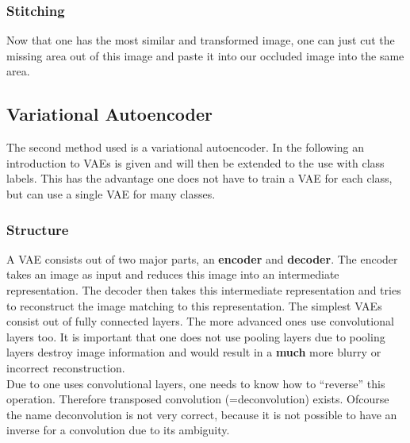 \documentclass[
     11pt,         %
     a4paper,      %
     oneside,
     ]{article}
\begin{document}
\subsubsection{Stitching}
Now that one has the most similar and transformed image, one can just cut the missing area out of this image and paste it into our occluded image into the same area.

\subsection{Variational Autoencoder}
The second method used is a variational autoencoder. In the following an introduction to VAEs is given and will then be extended to the use with class labels. This has the advantage one does not have to train a VAE for each class, but can use a single VAE for many classes.
\subsubsection{Structure}
A VAE consists out of two major parts, an \textbf{encoder} and \textbf{decoder}. The encoder takes an image as input and reduces this image into an intermediate representation. The decoder then takes this intermediate representation and tries to reconstruct the image matching to this representation. The simplest VAEs consist out of fully connected layers. The more advanced ones use convolutional layers too. It is important that one does not use pooling layers due to pooling layers destroy image information and would result in a \textbf{much} more blurry or incorrect reconstruction. \\
Due to one uses convolutional layers, one needs to know how to \enquote{reverse} this operation. Therefore transposed convolution (=deconvolution) exists. Ofcourse the name deconvolution is not very correct, because it is not possible to have an inverse for a convolution due to its ambiguity.
\end{document}
